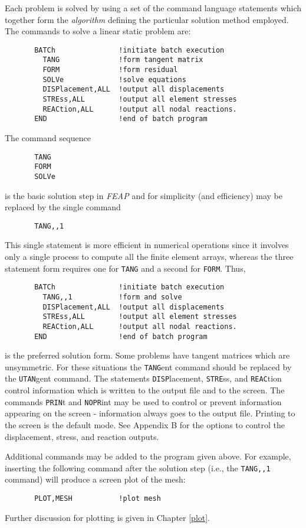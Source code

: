 Each problem is solved by using a set of the command language statements
which together form the {\it algorithm} defining the particular solution
method employed.  The commands to solve a linear static problem are:
\begin{verbatim}
       BATCh               !initiate batch execution
         TANG              !form tangent matrix
         FORM              !form residual
         SOLVe             !solve equations
         DISPlacement,ALL  !output all displacements
         STREss,ALL        !output all element stresses
         REACtion,ALL      !output all nodal reactions.
       END                 !end of batch program
\end{verbatim}
The command sequence
\begin{verbatim}
       TANG
       FORM
       SOLVe
\end{verbatim}
is the basic solution step in {\sl FEAP} and for simplicity (and efficiency)
may be replaced by the single command
\begin{verbatim}
       TANG,,1
\end{verbatim}
This single statement is more efficient in numerical operations
since it involves only a single
process to compute all the finite element arrays, whereas the three
statement form requires one for {\tt TANG} and a second for {\tt FORM}.
Thus,
\begin{verbatim}
       BATCh               !initiate batch execution
         TANG,,1           !form and solve
         DISPlacement,ALL  !output all displacements
         STREss,ALL        !output all element stresses
         REACtion,ALL      !output all nodal reactions.
       END                 !end of batch program
\end{verbatim}
is the preferred solution form.
Some problems have tangent matrices which are unsymmetric.  For these situations
the {\tt TANG}ent command should be replaced by the {\tt UTAN}gent command.
The statements {\tt DISP}lacement, {\tt STRE}ss, and {\tt REAC}tion control
information which is written to the output file and to the screen.
The commands {\tt PRIN}t and {\tt NOPR}int may be used to control or prevent
information appearing on the screen - information always goes to the
output file.  Printing to the screen is the default mode.  See Appendix B
for the options to control the displacement, stress, and reaction outputs.

Additional commands may be added to the program given above.  For example,
inserting the following command after the solution step (i.e., the
{\tt TANG,,1} command) will produce a screen plot of the mesh:
\begin{verbatim}
       PLOT,MESH           !plot mesh
\end{verbatim}
Further discussion for plotting is given in Chapter \ref{plot}.

